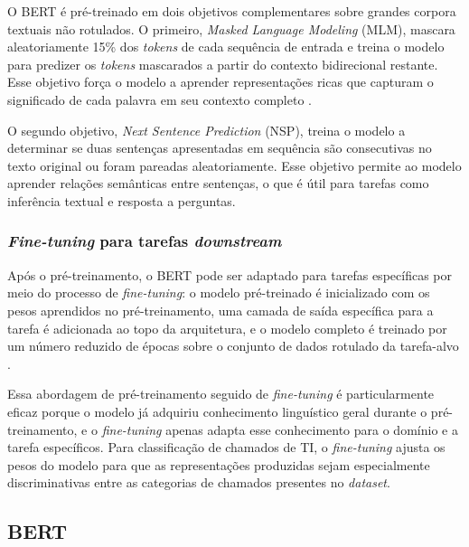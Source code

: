 \documentclass[
    12pt,                %
    openright,           %
    oneside,             %
    a4paper,             %
    english,             %
    brazil               %
]{abntex2}
\begin{document}
O BERT é pré-treinado em dois objetivos complementares sobre grandes corpora textuais não rotulados. O primeiro, \textit{Masked Language Modeling} (MLM), mascara aleatoriamente 15\% dos \textit{tokens} de cada sequência de entrada e treina o modelo para predizer os \textit{tokens} mascarados a partir do contexto bidirecional restante. Esse objetivo força o modelo a aprender representações ricas que capturam o significado de cada palavra em seu contexto completo \cite{devlin2019}.

O segundo objetivo, \textit{Next Sentence Prediction} (NSP), treina o modelo a determinar se duas sentenças apresentadas em sequência são consecutivas no texto original ou foram pareadas aleatoriamente. Esse objetivo permite ao modelo aprender relações semânticas entre sentenças, o que é útil para tarefas como inferência textual e resposta a perguntas.

\subsubsection{\textit{Fine-tuning} para tarefas \textit{downstream}}
\label{subsubsec:bert_finetune}

Após o pré-treinamento, o BERT pode ser adaptado para tarefas específicas por meio do processo de \textit{fine-tuning}: o modelo pré-treinado é inicializado com os pesos aprendidos no pré-treinamento, uma camada de saída específica para a tarefa é adicionada ao topo da arquitetura, e o modelo completo é treinado por um número reduzido de épocas sobre o conjunto de dados rotulado da tarefa-alvo \cite{devlin2019}.

Essa abordagem de pré-treinamento seguido de \textit{fine-tuning} é particularmente eficaz porque o modelo já adquiriu conhecimento linguístico geral durante o pré-treinamento, e o \textit{fine-tuning} apenas adapta esse conhecimento para o domínio e a tarefa específicos. Para classificação de chamados de TI, o \textit{fine-tuning} ajusta os pesos do modelo para que as representações produzidas sejam especialmente discriminativas entre as categorias de chamados presentes no \textit{dataset}.

\subsection{BERT}
\label{subsec:bert_modelo}

\end{document}
